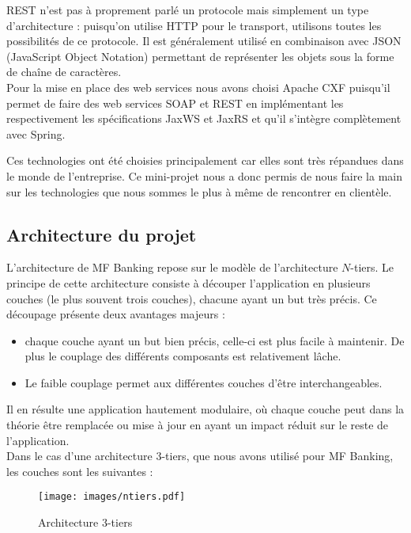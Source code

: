 REST n'est pas à proprement parlé un protocole mais simplement un type d'architecture : puisqu'on utilise HTTP pour le transport, utilisons toutes les possibilités de ce protocole. Il est généralement utilisé en combinaison avec JSON (JavaScript Object Notation) permettant de représenter les objets sous la forme de chaîne de caractères.\\

Pour la mise en place des web services nous avons choisi Apache CXF puisqu'il permet de faire des web services SOAP et REST en implémentant les respectivement les spécifications JaxWS et JaxRS et qu'il s'intègre complètement avec Spring.

Ces technologies ont été choisies principalement car elles sont très répandues dans le monde de l'entreprise. Ce mini-projet nous a donc permis de nous faire la main sur les technologies que nous sommes le plus à même de rencontrer en clientèle.

\subsection{Architecture du projet}

L'architecture de MF Banking repose sur le modèle de l'architecture $N$-tiers.
Le principe de cette architecture consiste à découper l'application en plusieurs couches (le plus souvent trois couches), chacune ayant un but très précis. Ce découpage présente deux avantages majeurs :

\begin{itemize}
	\item chaque couche ayant un but bien précis, celle-ci est plus facile à maintenir. De plus le couplage des différents composants est relativement lâche. 
	\item Le faible couplage permet aux différentes couches d'\^{e}tre interchangeables.
\end{itemize}

Il en résulte une application hautement modulaire, où chaque couche peut dans la théorie être remplacée ou mise à jour en ayant un impact réduit sur le reste de l'application.\\

Dans le cas d'une architecture 3-tiers, que nous avons utilisé pour MF Banking, les  couches sont les suivantes :

\begin{figure} [h!]
	\centering
		\texttt{[image: images/ntiers.pdf]}
	\caption{Architecture 3-tiers}
\end{figure}

